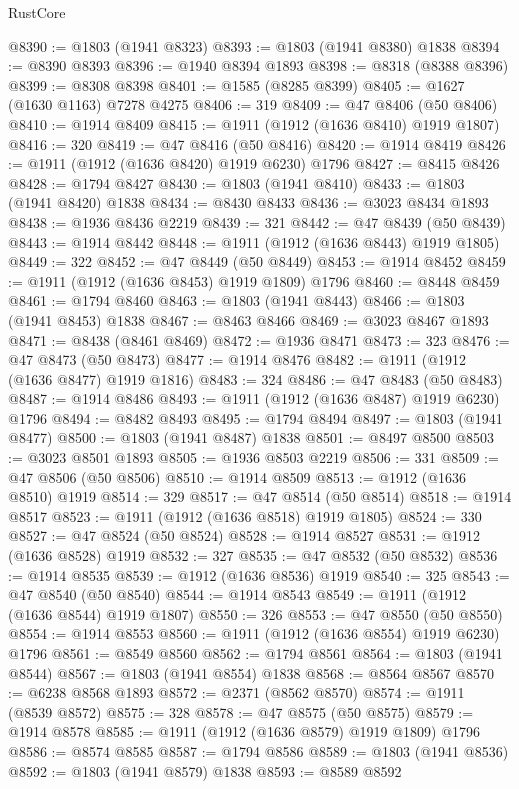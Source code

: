 \begin{lexlean}{RustCore}
\begin{coremodule}
@8390 := @1803 (@1941 @8323)
@8393 := @1803 (@1941 @8380) @1838
@8394 := @8390 @8393
@8396 := @1940 @8394 @1893
@8398 := @8318 (@8388 @8396)
@8399 := @8308 @8398
@8401 := @1585 (@8285 @8399)
@8405 := @1627 (@1630 @1163) @7278 @4275
@8406 := 319
@8409 := @47 @8406 (@50 @8406)
@8410 := @1914 @8409
@8415 := @1911 (@1912 (@1636 @8410) @1919 @1807)
@8416 := 320
@8419 := @47 @8416 (@50 @8416)
@8420 := @1914 @8419
@8426 := @1911 (@1912 (@1636 @8420) @1919 @6230) @1796
@8427 := @8415 @8426
@8428 := @1794 @8427
@8430 := @1803 (@1941 @8410)
@8433 := @1803 (@1941 @8420) @1838
@8434 := @8430 @8433
@8436 := @3023 @8434 @1893
@8438 := @1936 @8436 @2219
@8439 := 321
@8442 := @47 @8439 (@50 @8439)
@8443 := @1914 @8442
@8448 := @1911 (@1912 (@1636 @8443) @1919 @1805)
@8449 := 322
@8452 := @47 @8449 (@50 @8449)
@8453 := @1914 @8452
@8459 := @1911 (@1912 (@1636 @8453) @1919 @1809) @1796
@8460 := @8448 @8459
@8461 := @1794 @8460
@8463 := @1803 (@1941 @8443)
@8466 := @1803 (@1941 @8453) @1838
@8467 := @8463 @8466
@8469 := @3023 @8467 @1893
@8471 := @8438 (@8461 @8469)
@8472 := @1936 @8471
@8473 := 323
@8476 := @47 @8473 (@50 @8473)
@8477 := @1914 @8476
@8482 := @1911 (@1912 (@1636 @8477) @1919 @1816)
@8483 := 324
@8486 := @47 @8483 (@50 @8483)
@8487 := @1914 @8486
@8493 := @1911 (@1912 (@1636 @8487) @1919 @6230) @1796
@8494 := @8482 @8493
@8495 := @1794 @8494
@8497 := @1803 (@1941 @8477)
@8500 := @1803 (@1941 @8487) @1838
@8501 := @8497 @8500
@8503 := @3023 @8501 @1893
@8505 := @1936 @8503 @2219
@8506 := 331
@8509 := @47 @8506 (@50 @8506)
@8510 := @1914 @8509
@8513 := @1912 (@1636 @8510) @1919
@8514 := 329
@8517 := @47 @8514 (@50 @8514)
@8518 := @1914 @8517
@8523 := @1911 (@1912 (@1636 @8518) @1919 @1805)
@8524 := 330
@8527 := @47 @8524 (@50 @8524)
@8528 := @1914 @8527
@8531 := @1912 (@1636 @8528) @1919
@8532 := 327
@8535 := @47 @8532 (@50 @8532)
@8536 := @1914 @8535
@8539 := @1912 (@1636 @8536) @1919
@8540 := 325
@8543 := @47 @8540 (@50 @8540)
@8544 := @1914 @8543
@8549 := @1911 (@1912 (@1636 @8544) @1919 @1807)
@8550 := 326
@8553 := @47 @8550 (@50 @8550)
@8554 := @1914 @8553
@8560 := @1911 (@1912 (@1636 @8554) @1919 @6230) @1796
@8561 := @8549 @8560
@8562 := @1794 @8561
@8564 := @1803 (@1941 @8544)
@8567 := @1803 (@1941 @8554) @1838
@8568 := @8564 @8567
@8570 := @6238 @8568 @1893
@8572 := @2371 (@8562 @8570)
@8574 := @1911 (@8539 @8572)
@8575 := 328
@8578 := @47 @8575 (@50 @8575)
@8579 := @1914 @8578
@8585 := @1911 (@1912 (@1636 @8579) @1919 @1809) @1796
@8586 := @8574 @8585
@8587 := @1794 @8586
@8589 := @1803 (@1941 @8536)
@8592 := @1803 (@1941 @8579) @1838
@8593 := @8589 @8592

\end{coremodule}
\end{lexlean}
